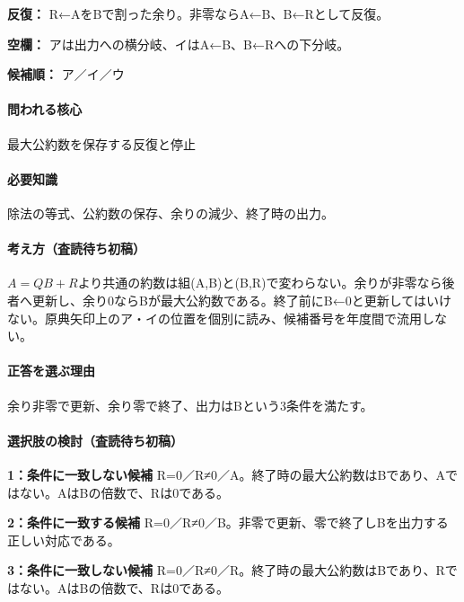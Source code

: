 \noindent\textbf{反復：} R←AをBで割った余り。非零ならA←B、B←Rとして反復。\par

\noindent\textbf{空欄：} アは出力への横分岐、イはA←B、B←Rへの下分岐。\par

\noindent\textbf{候補順：} ア／イ／ウ\par

\paragraph{問われる核心} 最大公約数を保存する反復と停止

\paragraph{必要知識} 除法の等式、公約数の保存、余りの減少、終了時の出力。

\paragraph{考え方（査読待ち初稿）} \(A=QB+R\)より共通の約数は組(A,B)と(B,R)で変わらない。余りが非零なら後者へ更新し、余り0ならBが最大公約数である。終了前にB←0と更新してはいけない。原典矢印上のア・イの位置を個別に読み、候補番号を年度間で流用しない。

\paragraph{正答を選ぶ理由} 余り非零で更新、余り零で終了、出力はBという3条件を満たす。

\paragraph{選択肢の検討（査読待ち初稿）}\mbox{}\par

\noindent\textbf{1：条件に一致しない候補} R=\allowbreak{}0／R≠0／A。終了時の最大公約数はBであり、Aではない。AはBの倍数で、Rは0である。\par

\noindent\textbf{2：条件に一致する候補} R=\allowbreak{}0／R≠0／B。非零で更新、零で終了しBを出力する正しい対応である。\par

\noindent\textbf{3：条件に一致しない候補} R=\allowbreak{}0／R≠0／R。終了時の最大公約数はBであり、Rではない。AはBの倍数で、Rは0である。\par

